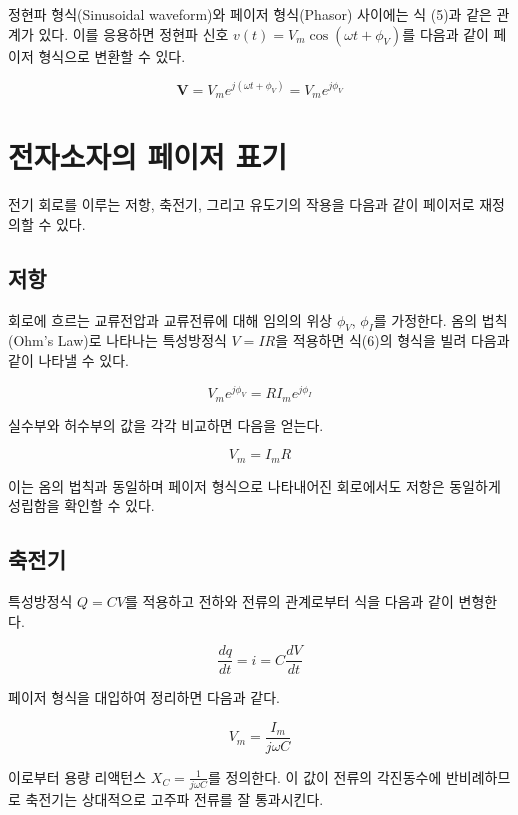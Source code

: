 \documentclass{article}
\begin{document}
정현파 형식(Sinusoidal waveform)와 페이저 형식(Phasor) 사이에는 식 (5)과 같은 관계가 있다. 이를 응용하면 정현파 신호 $v(t)=V_m \cos(\omega t+\phi_V)$를 다음과 같이 페이저 형식으로 변환할 수 있다.

\begin{equation}
    \boldsymbol{V}=V_m e^{j(\omega t+\phi_V)}=V_me^{j\phi_V}
\end{equation}

\section{전자소자의 페이저 표기}
전기 회로를 이루는 저항, 축전기, 그리고 유도기의 작용을 다음과 같이 페이저로 재정의할 수 있다.

\subsection{저항}
회로에 흐르는 교류전압과 교류전류에 대해 임의의 위상 $\phi_V$, $\phi_I$를 가정한다. 옴의 법칙(Ohm's Law)로 나타나는 특성방정식 $V=IR$을 적용하면 식(6)의 형식을 빌려 다음과 같이 나타낼 수 있다.

\begin{equation}
    V_me^{j\phi_V}=RI_me^{j\phi_I}
\end{equation}

실수부와 허수부의 값을 각각 비교하면 다음을 얻는다.

\begin{equation}
    V_m=I_mR
\end{equation}

이는 옴의 법칙과 동일하며 페이저 형식으로 나타내어진 회로에서도 저항은 동일하게 성립함을 확인할 수 있다.

\subsection{축전기}
특성방정식 $Q=CV$를 적용하고 전하와 전류의 관계로부터 식을 다음과 같이 변형한다.

\begin{equation}
    \frac{dq}{dt}=i=C\frac{dV}{dt}
\end{equation}

페이저 형식을 대입하여 정리하면 다음과 같다.

\begin{equation}
    V_m=\frac{I_m}{j\omega C}
\end{equation}

이로부터 용량 리액턴스 $X_C=\frac{1}{j\omega C}$를 정의한다. 이 값이 전류의 각진동수에 반비례하므로 축전기는 상대적으로 고주파 전류를 잘 통과시킨다.
\end{document}
